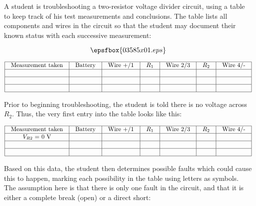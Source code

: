 

A student is troubleshooting a two-resistor voltage divider circuit, using a table to keep track of his test measurements and conclusions.  The table lists all components and wires in the circuit so that the student may document their known status with each successive measurement:

$$\epsfbox{03585x01.eps}$$


$$\vbox{\offinterlineskip
\halign{\strut
\vrule \quad\hfil # \ \hfil & 
\vrule \quad\hfil # \ \hfil & 
\vrule \quad\hfil # \ \hfil & 
\vrule \quad\hfil # \ \hfil & 
\vrule \quad\hfil # \ \hfil & 
\vrule \quad\hfil # \ \hfil & 
\vrule \quad\hfil # \ \hfil \vrule \cr
\noalign{\hrule}
%
Measurement taken & Battery & Wire +/1 & $R_1$ & Wire 2/3 & $R_2$ & Wire 4/- \cr
%
\noalign{\hrule}
%
  &  &  &  &  &  &  \cr
%
\noalign{\hrule}
%
  &  &  &  &  &  &  \cr
%
\noalign{\hrule}
%
  &  &  &  &  &  &  \cr
%
\noalign{\hrule}
} %
}$$ %

Prior to beginning troubleshooting, the student is told there is no voltage across $R_2$.  Thus, the very first entry into the table looks like this:


$$\vbox{\offinterlineskip
\halign{\strut
\vrule \quad\hfil # \ \hfil & 
\vrule \quad\hfil # \ \hfil & 
\vrule \quad\hfil # \ \hfil & 
\vrule \quad\hfil # \ \hfil & 
\vrule \quad\hfil # \ \hfil & 
\vrule \quad\hfil # \ \hfil & 
\vrule \quad\hfil # \ \hfil \vrule \cr
\noalign{\hrule}
%
Measurement taken & Battery & Wire +/1 & $R_1$ & Wire 2/3 & $R_2$ & Wire 4/- \cr
%
\noalign{\hrule}
%
$V_{R2}$ = 0 V &  &  &  &  &  &  \cr
%
\noalign{\hrule}
%
  &  &  &  &  &  &  \cr
%
\noalign{\hrule}
%
  &  &  &  &  &  &  \cr
%
\noalign{\hrule}
} %
}$$ %

Based on this data, the student then determines possible faults which could cause this to happen, marking each possibility in the table using letters as symbols.  The assumption here is that there is only one fault in the circuit, and that it is either a complete break (open) or a direct short:

